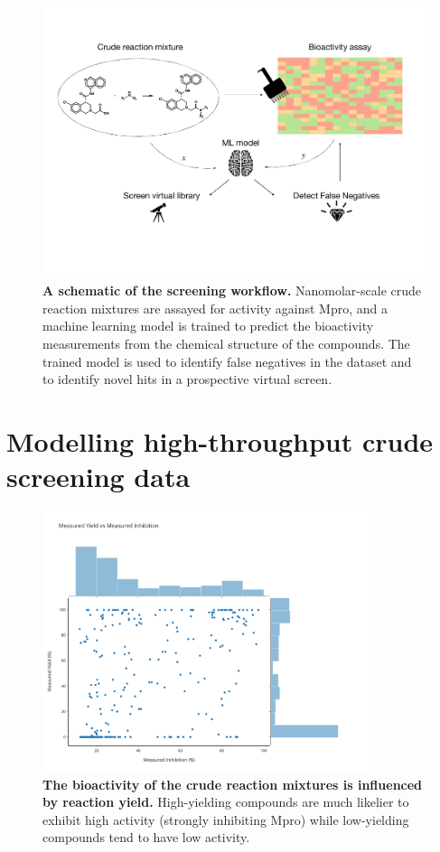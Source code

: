 \begin{figure}[!t]
 \centering
 \includegraphics[width=\textwidth]{Chapters/Crude/Figs/schematic.pdf}
 \caption{\textbf{A schematic of the screening workflow.} Nanomolar-scale crude reaction mixtures are assayed for activity against Mpro, and a machine learning model is trained to predict the bioactivity measurements from the chemical structure of the compounds. The trained model is used to identify false negatives in the dataset and to identify novel hits in a prospective virtual screen.}
 \label{fig:schematic}
\end{figure}

\section{Modelling high-throughput crude screening data}

\begin{figure}[!t]
 \centering
 \includegraphics[width=0.85\textwidth]{Chapters/Crude/Figs/yield_vs_activity.pdf}
 \caption{\textbf{The bioactivity of the crude reaction mixtures is influenced by reaction yield.} High-yielding compounds are much likelier to exhibit high activity (strongly inhibiting Mpro) while low-yielding compounds tend to have low activity.}
 \label{fig:yield_activity}
\end{figure}


